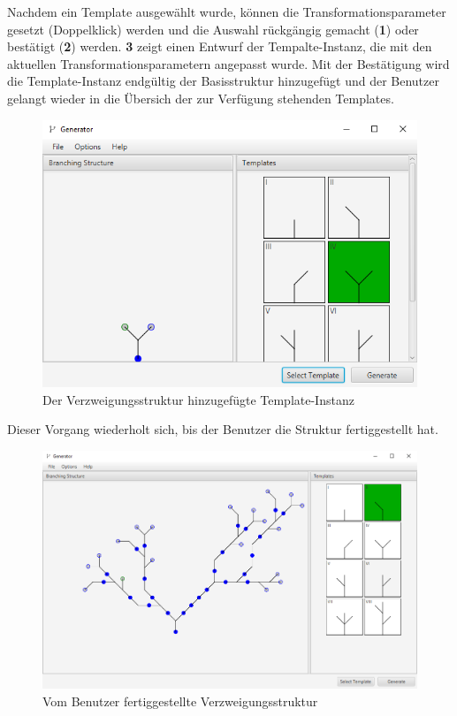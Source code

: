 Nachdem ein Template ausgewählt wurde, können die Transformationsparameter gesetzt (Doppelklick) werden und die Auswahl
rückgängig gemacht (\textbf{1}) oder bestätigt (\textbf{2}) werden.
\textbf{3} zeigt einen Entwurf der Tempalte-Instanz, die mit den aktuellen Transformationsparametern angepasst wurde.
Mit der Bestätigung wird die Template-Instanz endgültig der Basisstruktur hinzugefügt und der Benutzer gelangt wieder
in die Übersich der zur Verfügung stehenden Templates.
\begin{figure}[H]
    \centering
    \includegraphics[width=12cm]{../images/UI_applied.png}
    \caption{Der Verzweigungsstruktur hinzugefügte Template-Instanz}
\end{figure}

Dieser Vorgang wiederholt sich, bis der Benutzer die Struktur fertiggestellt hat.
\begin{figure}[H]
    \centering
    \includegraphics[width=13cm]{../images/UI_finished.png}
    \caption{Vom Benutzer fertiggestellte Verzweigungsstruktur}
\end{figure}

